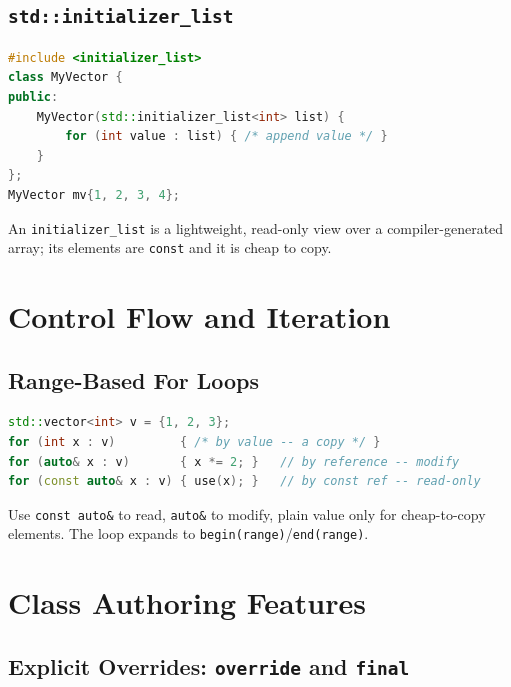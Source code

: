 \subsection{\texttt{std::initializer\_list}}

\begin{lstlisting}[language=C++, caption={accepting a brace list in a constructor}]
#include <initializer_list>
class MyVector {
public:
    MyVector(std::initializer_list<int> list) {
        for (int value : list) { /* append value */ }
    }
};
MyVector mv{1, 2, 3, 4};
\end{lstlisting}

An \texttt{initializer\_list} is a lightweight, read-only view over a compiler-generated array; its elements are \texttt{const} and it is cheap to copy.

\section{Control Flow and Iteration}

\subsection{Range-Based For Loops}

\begin{lstlisting}[language=C++, caption={the three idiomatic range-for forms}]
std::vector<int> v = {1, 2, 3};
for (int x : v)         { /* by value -- a copy */ }
for (auto& x : v)       { x *= 2; }   // by reference -- modify
for (const auto& x : v) { use(x); }   // by const ref -- read-only
\end{lstlisting}

Use \texttt{const auto\&} to read, \texttt{auto\&} to modify, plain value only for cheap-to-copy elements. The loop expands to \texttt{begin(range)}/\texttt{end(range)}.

\section{Class Authoring Features}

\subsection{Explicit Overrides: \texttt{override} and \texttt{final}}

